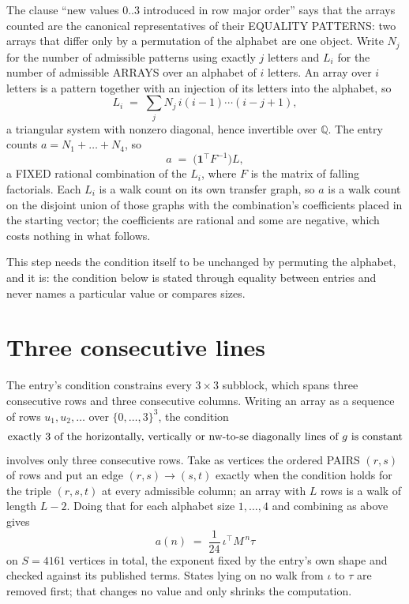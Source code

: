 \documentclass[11pt,a4paper]{article}
\theoremstyle{plain}
\theoremstyle{definition}
\begin{document}
The clause ``new values $0..3$ introduced in row major order'' says that the arrays
counted are the canonical representatives of their EQUALITY PATTERNS: two arrays that differ
only by a permutation of the alphabet are one object. Write $N_j$ for the number of admissible
patterns using exactly $j$ letters and $L_i$ for the number of admissible ARRAYS over an
alphabet of $i$ letters. An array over $i$ letters is a pattern together with an injection of
its letters into the alphabet, so
\[
L_i\;=\;\sum_{j}N_j\,i(i-1)\cdots(i-j+1),
\]
a triangular system with nonzero diagonal, hence invertible over $\mathbb{Q}$. The entry
counts $a=N_1+\dots+N_{4}$, so
\[
a\;=\;\bigl(\mathbf{1}^{\!\top}F^{-1}\bigr)L ,
\]
a FIXED rational combination of the $L_i$, where $F$ is the matrix of falling factorials.
Each $L_i$ is a walk count on its own transfer graph, so $a$ is a walk count on the disjoint
union of those graphs with the combination's coefficients placed in the starting vector; the
coefficients are rational and some are negative, which costs nothing in what follows.

This step needs the condition itself to be unchanged by permuting the alphabet, and it is:
the condition below is stated through equality between entries and never names a particular
value or compares sizes.

\section{Three consecutive lines}

The entry's condition constrains every $3\times3$ subblock, which spans three consecutive
rows and three consecutive columns. Writing an array as a sequence of rows
$u_1,u_2,\dots$ over $\{0,\dots,3\}^{3}$, the condition
\[
\text{exactly }3\text{ of the horizontally, vertically or nw-to-se diagonally lines of }g\text{ \text{is constant}}
\]
involves only three consecutive rows. Take as vertices the ordered PAIRS $(r,s)$ of
rows and put an edge $(r,s)\to(s,t)$ exactly when the condition holds for the triple
$(r,s,t)$ at every admissible column; an array with $L$ rows is a walk of length $L-2$.
Doing that for each alphabet size $1,\dots,4$ and combining as above gives
\[
a(n)\;=\;\frac{1}{24}\,\iota^{\!\top}M^{\,n}\tau
\]
on $S=4161$ vertices in total, the exponent fixed by the entry's own shape and checked against
its published terms. States lying on no walk from $\iota$ to $\tau$ are removed first; that
changes no value and only shrinks the computation.
\end{document}
